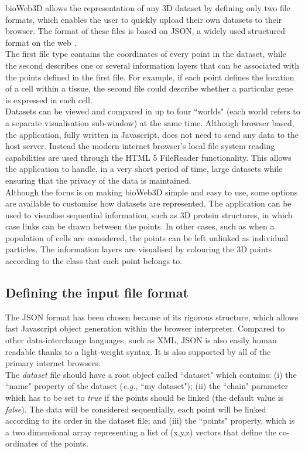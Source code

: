 \documentclass[10pt]{bmc_article}
\newenvironment{bmcformat}{\baselineskip20pt\sloppy\setboolean{publ}{false}}{\baselineskip20pt\sloppy}
\begin{document}
\begin{bmcformat}
bioWeb3D allows the representation of any 3D dataset by defining only two file formats, which enables the user to quickly upload their own datasets to their browser. The format of these files is based on JSON, a widely used structured format on the web \cite{Wilde07}.\\
The first file type contains the coordinates of every point in the dataset, while the second describes one or several information layers that can be associated with the points defined in the first file. For example, if each point defines the location of a cell within a tissue, the second file could describe whether a particular gene is expressed in each cell. \\
Datasets can be viewed and compared in up to four ``worlds" (each world refers to a separate visualisation sub-window) at the same time. Although browser based, the application, fully written in Javascript, does not need to send any data to the host server. Instead the modern internet browser's local file system reading capabilities are used through the HTML 5 FileReader functionality. This allows the application to handle, in a very short period of time, large datasets while ensuring that the privacy of the data is maintained.\\
Although the focus is on making bioWeb3D simple and easy to use, some options are available to customise how datasets are represented. The application can be used to visualise sequential information, such as 3D protein structures, in which case links can be drawn between the points. In other cases, such as when a population of cells are considered, the points can be left unlinked as individual particles. The information layers are visualised by colouring the 3D points according to the class that each point belongs to.
\subsection{Defining the input file format}
The JSON format has been chosen because of its rigorous structure, which allows fast Javascript object generation within the browser interpreter. Compared to other data-interchange languages, such as XML, JSON is also easily human readable thanks to a light-weight syntax. It is also supported by all of the primary internet browsers.\\
The {\it{dataset}} file should have a root object called ``dataset" which contains: (i) the ``name" property of the dataset (\textit{e.g.}, ``my dataset"); (ii) the ``chain" parameter which has to be set to \textit{true} if the points should be linked (the default value is \textit{false}). The data will be considered sequentially, each point will be linked according to its order in the dataset file; and (iii) the ``points" property, which is a two dimensional array representing a list of (x,y,z) vectors that define the co-ordinates of the points.


\end{bmcformat}
\end{document}
